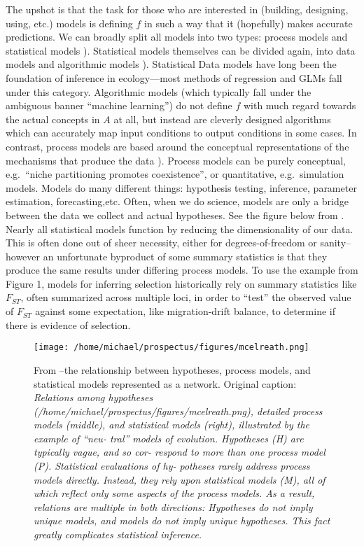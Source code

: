 \documentclass[]{article}
\begin{document}
The upshot is that the task for those who are interested in (building,
designing, using, etc.) models is defining \(f\) in such a way that it
(hopefully) makes accurate predictions. We can broadly split all models
into two types: process models and statistical models
\citep{mcelreath_statistical_2020}). Statistical models themselves can be divided
again, into data models and algorithmic models \citep{breiman_statistical_2001}).
Statistical Data models have long been the foundation of inference in
ecology---most methods of regression and GLMs fall under this category.
Algorithmic models (which typically fall under the ambiguous banner
``machine learning'') do not define \(f\) with much regard towards the
actual concepts in \(A\) at all, but instead are cleverly designed
algorithms which can accurately map input conditions to output
conditions in some cases. In contrast, process models are based around
the conceptual representations of the mechanisms that produce the data \citep{mcelreath_statistical_2020}). Process models can be purely conceptual, e.g.~``niche partitioning promotes
coexistence'', or quantitative, e.g.~simulation models.
\renewcommand*{\arraystretch}{1.4}
Models do many different things: hypothesis testing, inference,
parameter estimation, forecasting,etc. Often, when we do science, models
are only a bridge between the data we collect and actual hypotheses. See
the figure below from \citep{mcelreath_statistical_2020}. Nearly all statistical
models function by reducing the dimensionality of our data. This is
often done out of sheer necessity, either for degrees-of-freedom or
sanity--however an unfortunate byproduct of some summary statistics is
that they produce the same results under differing process models. To
use the example from Figure 1, models for inferring selection
historically rely on summary statistics like \(F_{ST}\), often
summarized across multiple loci, in order to ``test'' the observed value
of \(F_{ST}\) against some expectation, like migration-drift balance, to
determine if there is evidence of selection.

\begin{figure}[h]
\centering
\texttt{[image: /home/michael/prospectus/figures/mcelreath.png]}
    \caption{From \citet{mcelreath_statistical_2020}--the relationship between hypotheses,
process models, and statistical models represented as a network.
Original caption: \emph{Relations among hypotheses
(/home/michael/prospectus/figures/mcelreath.png), detailed process
models (middle), and statistical models (right), illustrated by the
example of ``neu- tral'' models of evolution. Hypotheses (H) are
typically vague, and so cor- respond to more than one process model (P).
Statistical evaluations of hy- potheses rarely address process models
directly. Instead, they rely upon statistical models (M), all of which
reflect only some aspects of the process models. As a result, relations
are multiple in both directions: Hypotheses do not imply unique models,
and models do not imply unique hypotheses. This fact greatly complicates
statistical inference.}}
\end{figure}
\end{document}
